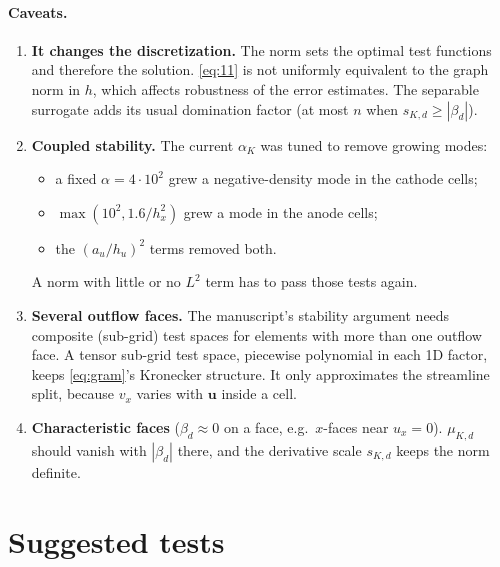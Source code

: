 \documentclass[11pt]{article}
\theoremstyle{remark}
\begin{document}
\paragraph{Caveats.}
\begin{enumerate}[nosep]
  \item \textbf{It changes the discretization.}  The norm sets the optimal test functions and therefore the solution.
        \eqref{eq:11} is not uniformly equivalent to the graph norm in $h$, which affects robustness of the error
        estimates.  The separable surrogate adds its usual domination factor (at most $n$ when $s_{K,d}\ge|\beta_d|$).
  \item \textbf{Coupled stability.}  The current $\alpha_K$ was tuned to remove growing modes:
        \begin{itemize}[nosep]
          \item a fixed $\alpha=4\cdot10^2$ grew a negative-density mode in the cathode cells;
          \item $\max(10^2, 1.6/h_x^2)$ grew a mode in the anode cells;
          \item the $(a_u/h_u)^2$ terms removed both.
        \end{itemize}
        A norm with little or no $L^2$ term has to pass those tests again.
  \item \textbf{Several outflow faces.}  The manuscript's stability argument needs composite (sub-grid) test spaces
        for elements with more than one outflow face.  A tensor sub-grid test space, piecewise polynomial in each 1D
        factor, keeps \eqref{eq:gram}'s Kronecker structure.  It only approximates the streamline split, because
        $v_x$ varies with $\mathbf u$ inside a cell.
  \item \textbf{Characteristic faces} ($\beta_d\approx0$ on a face, e.g.\ $x$-faces near $u_x=0$).  $\mu_{K,d}$ should
        vanish with $|\beta_d|$ there, and the derivative scale $s_{K,d}$ keeps the norm definite.
\end{enumerate}

\section{Suggested tests}
\end{document}
